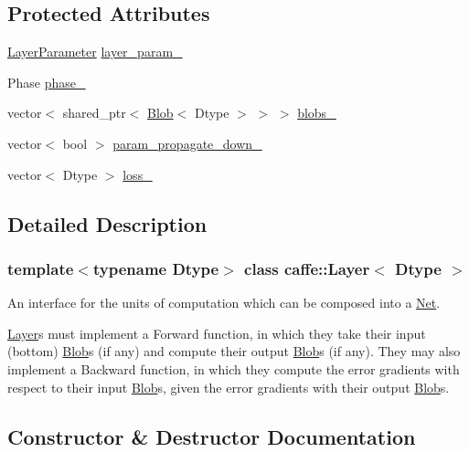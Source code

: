 \subsection*{Protected Attributes}
\begin{DoxyCompactItemize}
\item 
\mbox{\hyperlink{classcaffe_1_1_layer_parameter}{Layer\+Parameter}} \mbox{\hyperlink{classcaffe_1_1_layer_a7ed12bb2df25c887e41d7ea9557fc701}{layer\+\_\+param\+\_\+}}
\item 
Phase \mbox{\hyperlink{classcaffe_1_1_layer_a1d04ad7f595a82a1c811f102d68b8a19}{phase\+\_\+}}
\item 
vector$<$ shared\+\_\+ptr$<$ \mbox{\hyperlink{classcaffe_1_1_blob}{Blob}}$<$ Dtype $>$ $>$ $>$ \mbox{\hyperlink{classcaffe_1_1_layer_a8d6998a5f8ca95990976021de743dd21}{blobs\+\_\+}}
\item 
vector$<$ bool $>$ \mbox{\hyperlink{classcaffe_1_1_layer_ab1db6c32fa71343dac868b07288eb45e}{param\+\_\+propagate\+\_\+down\+\_\+}}
\item 
vector$<$ Dtype $>$ \mbox{\hyperlink{classcaffe_1_1_layer_a5fbf5ce7385b2da3d8edc7eec3822ac7}{loss\+\_\+}}
\end{DoxyCompactItemize}


\subsection{Detailed Description}
\subsubsection*{template$<$typename Dtype$>$\newline
class caffe\+::\+Layer$<$ Dtype $>$}

An interface for the units of computation which can be composed into a \mbox{\hyperlink{classcaffe_1_1_net}{Net}}. 

\mbox{\hyperlink{classcaffe_1_1_layer}{Layer}}s must implement a Forward function, in which they take their input (bottom) \mbox{\hyperlink{classcaffe_1_1_blob}{Blob}}s (if any) and compute their output \mbox{\hyperlink{classcaffe_1_1_blob}{Blob}}s (if any). They may also implement a Backward function, in which they compute the error gradients with respect to their input \mbox{\hyperlink{classcaffe_1_1_blob}{Blob}}s, given the error gradients with their output \mbox{\hyperlink{classcaffe_1_1_blob}{Blob}}s. 

\subsection{Constructor \& Destructor Documentation}
\mbox{\label{classcaffe_1_1_layer_a7b4e4ccea08c7b8b15acc6829d5735f6}} 
